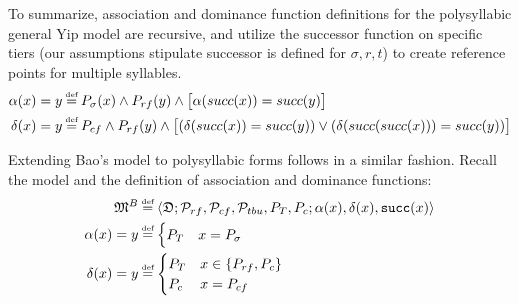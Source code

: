 \documentclass{article}
\newcommand\myeq{\mathrel{\stackrel{\makebox[0pt]{\mbox{\normalfont\tiny def}}}{=}}}
\begin{document}
\begin{center}
\end{center}
To summarize, association and dominance function definitions for the polysyllabic general Yip model are recursive, and utilize the successor function on specific tiers (our assumptions stipulate successor is defined for $\sigma, r, t$) to create reference points for multiple syllables.
\begin{equation}
\begin{aligned}
\alpha(x)=y&\myeq P_{\sigma}(x)\land P_{rf}(y)\land\big[\alpha(succ(x))=succ(y)\big] \\
\delta(x)=y&\myeq P_{cf}\land P_{rf}(y)\land\big[(\delta(succ(x))=succ(y))\lor(\delta(succ(succ(x)))=succ(y))\big]
\end{aligned}
\end{equation} \par
Extending Bao's model to polysyllabic forms follows in a similar fashion. Recall the model and the definition of association and dominance functions:
\begin{align}
\mathfrak{M}^{B} &\myeq \langle\mathfrak{D}; \mathcal{P}_{rf}, \mathcal{P}_{cf}, \mathcal{P}_{tbu}, P_{T}, P_{c}; \alpha(x), \delta(x), \mathtt{succ}(x)\rangle \\
\alpha(x)=y&\myeq \begin{cases} P_{T} & x=P_{\sigma} \end{cases} \\  
\delta(x)=y&\myeq \begin{cases} P_{T} & x\in\{P_{rf},P_{c}\} \\ P_{c} & x=P_{cf} \end{cases}
\end{align} 
\end{document}
